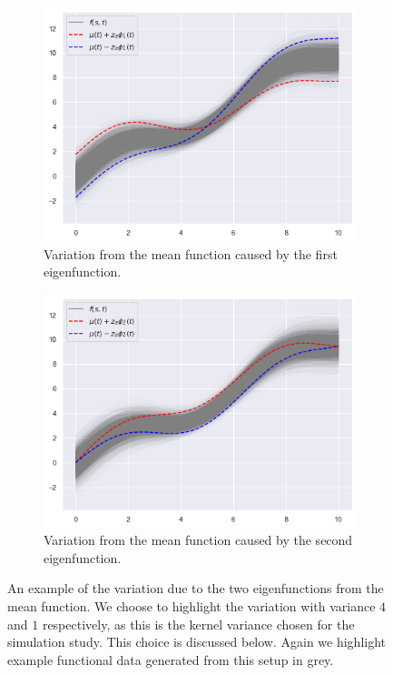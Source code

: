 \begin{figure}
	\centering
	\begin{subfigure}[b]{0.45\textwidth}
		\includegraphics[width=\textwidth]{sim_eig_1}
		\caption{Variation from the mean function caused by the first eigenfunction.}
		\label{fig:sim_eig1}
	\end{subfigure}
	\hfill        
	\begin{subfigure}[b]{0.45\textwidth}
		\includegraphics[width=\textwidth]{sim_eig_2}
		\caption{Variation from the mean function caused by the second eigenfunction.}
		\label{fig:sim_eig2}
	\end{subfigure}
	\caption{An example of the variation due to the two eigenfunctions from the mean function. We choose to highlight the variation with variance $4$ and $1$ respectively, as this is the kernel variance chosen for the simulation study. This choice is discussed below. Again we highlight example functional data generated from this setup in grey.}
\end{figure}

